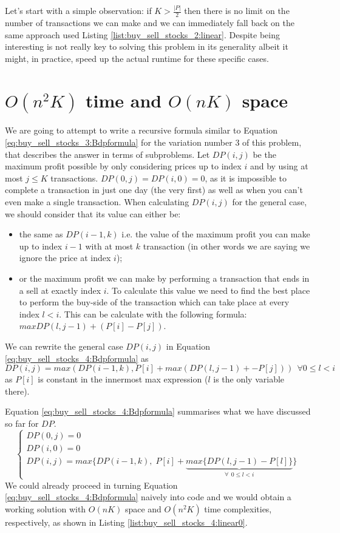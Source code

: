 Let's start with a simple observation: if $K > \frac{|P|}{2}$ then there is no limit on the number of transactions we can make
and we can immediately fall back on the same approach used Listing \ref{list:buy_sell_stocks_2:linear}.
Despite being interesting is not really key to solving this problem in its generality albeit it might, in practice, speed up the actual runtime for these specific cases.


\section{$O(n^2K)$ time and $O(nK)$ space}
\label{buy_sell_stocks4:sec:linerartime1}
We are going to attempt to write a recursive formula similar to Equation \ref{eq:buy_sell_stocks_3:Bdpformula} for the variation number $3$ of this problem, that describes the answer in terms of subproblems.
Let $DP(i,j)$ be the maximum profit possible by only considering prices up to index $i$ and by using at most $j \leq K$ transactions.
$DP(0,j)=DP(i,0)=0$, as it is impossible to complete a transaction in just one day (the very first) as well as when you can't even make a single transaction.
When calculating $DP(i,j)$ for the general case, we should consider that its value can either be:
\begin{itemize}
    \item the same as $DP(i-1,k)$ i.e. the value of the maximum profit you can make up to index $i-1$ with at most $k$ transaction (in other words we are saying we ignore the price at index $i$);
    \item or the maximum profit we can make by performing a transaction that ends in a sell at exactly index $i$. To calculate this value we need to find the best place to perform the buy-side of the transaction which can take place at every index $l < i$. This can be calculate with the following formula: $max DP(l,j-1) + (P[i]-P[j])$.
\end{itemize}
We can rewrite the general case $DP(i,j)$ in Equation \ref{eq:buy_sell_stocks_4:Bdpformula} as 
$$DP(i,j) = max(DP(i-1,k), P[i] + max(DP(l,j-1)+-P[j])) \: \: \forall 0 \leq l < i$$ as $P[i]$ is constant in the innermost max expression ($l$ is the only variable there).

Equation \ref{eq:buy_sell_stocks_4:Bdpformula} summarises what we have discussed so far for $DP$.
\begin{equation}
    \begin{cases}
        DP(0,j) = 0 \\
        DP(i,0) = 0 \\
        DP(i,j) = max\Big\{DP(i-1,k), \; P[i] + \underbrace{max\big\{DP(l,j-1)-P[l]\big\}}_{\forall \: \: 0 \leq l < i}\Big\}
     \end{cases}
    \label{eq:buy_sell_stocks_4:Bdpformula}
\end{equation}
We could already proceed in turning Equation \ref{eq:buy_sell_stocks_4:Bdpformula} naively into code and we would obtain a working solution with $O(nK)$ space and $O(n^2K)$ time complexities, 
respectively, as shown in Listing \ref{list:buy_sell_stocks_4:linear0}.

